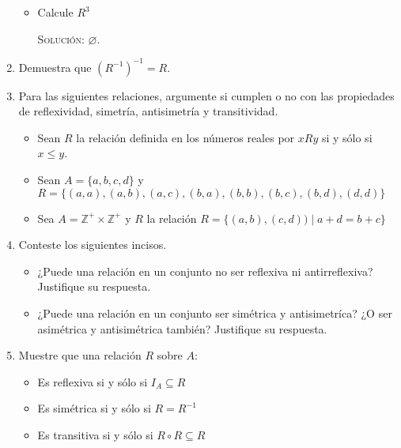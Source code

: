 \documentclass[letterpaper,11pt]{article}
\begin{document}
\begin{enumerate}
\begin{itemize}
        \item Calcule $R^{3}$

        \textsc{Solución:} $\varnothing$.
    \end{itemize}

    \item Demuestra que $(R^{-1})^{-1} = R$.

    \item Para las siguientes relaciones, argumente si cumplen o no con las 
    propiedades de reflexividad, simetría, antisimetría y transitividad.

    \begin{itemize}
        \item Sean $R$ la relación definida en los números reales por $xRy$
        si y sólo si $x \leq y$.
        \item Sean $A = \{a,b,c,d\}$ y $R = \{(a,a), (a,b), (a,c), (b,a), (b,b),
        (b,c), (b,d), (d,d)\}$
        \item Sea $A = ℤ^{+} × ℤ^{+}$ y $R$ la relación $R = \{(a,b), (c,d)) \; 
        | \; a + d = b + c\}$
    \end{itemize}

    \item Conteste los siguientes incisos.
    \begin{itemize}
        \item ¿Puede una relación en un conjunto no ser reflexiva ni
        antirreflexiva? Justifique su respuesta.
        \item ¿Puede una relación en un conjunto ser simétrica y 
        antisimetríca? ¿O ser asimétrica y antisimétrica también? Justifique su
        respuesta.  
    \end{itemize}

    \item Muestre que una relación $R$ sobre $A$:
    \begin{itemize}
        \item Es reflexiva si y sólo si $I_{A} ⊆ R$
        \item Es simétrica si y sólo si $R = R^{-1}$
        \item Es transitiva si y sólo si $R ∘ R ⊆ R$
    \end{itemize}


\end{enumerate}
\end{document}
